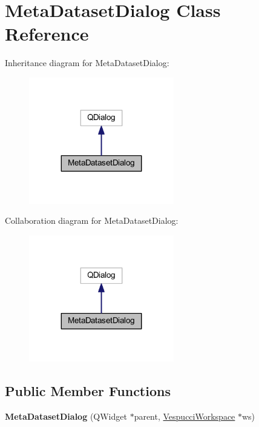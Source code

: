 \hypertarget{class_meta_dataset_dialog}{\section{Meta\+Dataset\+Dialog Class Reference}
\label{class_meta_dataset_dialog}
}


Inheritance diagram for Meta\+Dataset\+Dialog\+:\nopagebreak
\begin{figure}[H]
\begin{center}
\leavevmode
\includegraphics[width=179pt]{class_meta_dataset_dialog__inherit__graph}
\end{center}
\end{figure}


Collaboration diagram for Meta\+Dataset\+Dialog\+:\nopagebreak
\begin{figure}[H]
\begin{center}
\leavevmode
\includegraphics[width=179pt]{class_meta_dataset_dialog__coll__graph}
\end{center}
\end{figure}
\subsection*{Public Member Functions}
\begin{DoxyCompactItemize}
\item 
\hypertarget{class_meta_dataset_dialog_ad418f69956d5b548f61530c98dfb1e6b}{{\bfseries Meta\+Dataset\+Dialog} (Q\+Widget $\ast$parent, \hyperlink{class_vespucci_workspace}{Vespucci\+Workspace} $\ast$ws)}\label{class_meta_dataset_dialog_ad418f69956d5b548f61530c98dfb1e6b}

\end{DoxyCompactItemize}


